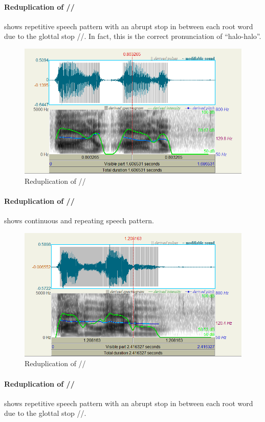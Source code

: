 \documentclass{article}
\begin{document}
\paragraph{Reduplication of //}  shows repetitive speech pattern with
an abrupt stop in between each root word due to the glottal stop //. In fact, this is the
correct pronunciation of ``halo-halo''.

\begin{figure}
    \centering
    \includegraphics[width=0.65\linewidth]{img/hal_o.png}
    \caption{Reduplication of //}\label{fig:hal'o}
\end{figure}

\paragraph{Reduplication of //}  shows continuous and repeating
speech pattern.

\begin{figure}
    \centering
    \includegraphics[width=0.65\linewidth]{img/halu.png}
    \caption{Reduplication of //}\label{fig:halu}
\end{figure}

\paragraph{Reduplication of //}  shows repetitive speech pattern with
an abrupt stop in between each root word due to the glottal stop //.
\end{document}
